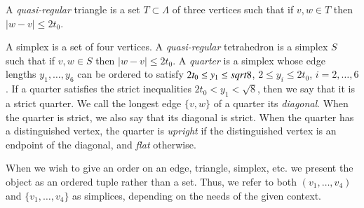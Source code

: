 \begin{definition}
A {\it quasi-regular\/} triangle is
a set $T\subset \Lambda$ of three vertices such that if $v,w\in T$
then $|w-v|\le2t_0$. \end{definition}

\begin{definition}
A  simplex is a set of four
vertices.
A {\it quasi-regular\/} tetrahedron is a simplex $S$ such that if
$v,w\in S$ then $|w-v|\le 2t_0$. A {\it quarter\/} is a simplex
whose edge lengths $y_1,\ldots,y_6$ can be ordered to satisfy
$2t_0\le y_1\le sqrt8$, $2\le y_i\le 2t_0$, $i=2,\ldots,6$. If a
quarter satisfies the strict inequalities $2t_0< y_1< \sqrt8$,
then we say that it is a strict quarter. We call the longest edge
$\{v,w\}$ of a quarter its {\it {} diagonal\/}. When
the quarter is strict, we also say that its diagonal is strict.
When the quarter has a distinguished vertex, the quarter is {\it
upright\/} if the distinguished vertex is an endpoint of the
diagonal, and {\it flat\/} otherwise.
\end{definition}
 
 
 



When we wish to give an order on an edge, triangle, simplex, etc.
we present the object as an ordered tuple rather than a set. Thus,
we refer to both $(v_1,\ldots,v_4)$ and $\{v_1,\ldots,v_4\}$ as
simplices, depending on the needs of the given context.



